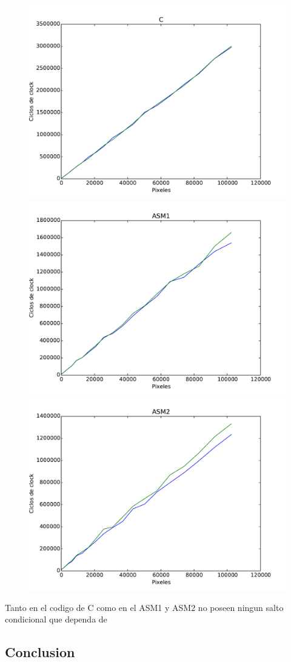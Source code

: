 \begin{figure}[h!]
	\centering
	\includegraphics[scale=0.28]{images/c_blur_lena}
	\includegraphics[scale=0.28]{images/asm1_blur_lena}
	\includegraphics[scale=0.28]{images/asm2_blur_lena}
\end{figure}

Tanto en el codigo de C como en el ASM1 y ASM2 no poseen ningun salto condicional que dependa de 

\subsection{Conclusion}